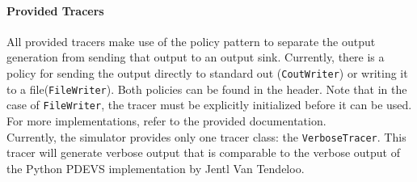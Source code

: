 \paragraph{Provided Tracers}
All provided tracers make use of the policy pattern to separate the output generation from sending that output to an output sink. Currently, there is a policy for sending the output directly to standard out (\lstinline{CoutWriter}) or writing it to a file(\lstinline{FileWriter}). Both policies can be found in the  header. Note that in the case of \lstinline{FileWriter}, the tracer must be explicitly initialized before it can be used. For more implementations, refer to the provided documentation.\\
Currently, the simulator provides only one tracer class: the \lstinline{VerboseTracer}. This tracer will generate verbose output that is comparable to the verbose output of the Python PDEVS implementation by Jentl Van Tendeloo.
